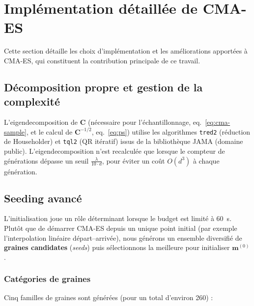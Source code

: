 \section{Implémentation détaillée de CMA-ES}
\label{sec:cmaes-details}

Cette section détaille les choix d'implémentation et les améliorations
apportées à CMA-ES, qui constituent la contribution principale de ce travail.

\subsection{Décomposition propre et gestion de la complexité}

L'eigendecomposition de $\mathbf{C}$ (nécessaire pour l'échantillonnage,
eq.~\ref{eq:cma-sample}, et le calcul de $\mathbf{C}^{-1/2}$,
eq.~\ref{eq:ps}) utilise les algorithmes \texttt{tred2} (réduction de
Householder) et \texttt{tql2} (QR itératif) issus de la bibliothèque JAMA
(domaine public).  L'eigendecomposition n'est recalculée que lorsque le
compteur de générations dépasse un seuil
$\frac{\lambda}{10 \cdot d}$,
pour éviter un coût $O(d^3)$ à chaque génération.

\subsection{Seeding avancé}
\label{sec:seeding}

L'initialisation joue un rôle déterminant lorsque le budget est limité à
60~s.  Plutôt que de démarrer CMA-ES depuis un unique point initial (par
exemple l'interpolation linéaire départ--arrivée), nous générons un ensemble
diversifié de \textbf{graines candidates} (\textit{seeds}) puis sélectionnons la meilleure
pour initialiser $\mathbf{m}^{(0)}$.

\subsubsection{Catégories de graines}

Cinq familles de graines sont générées (pour un total d'environ 260) :

